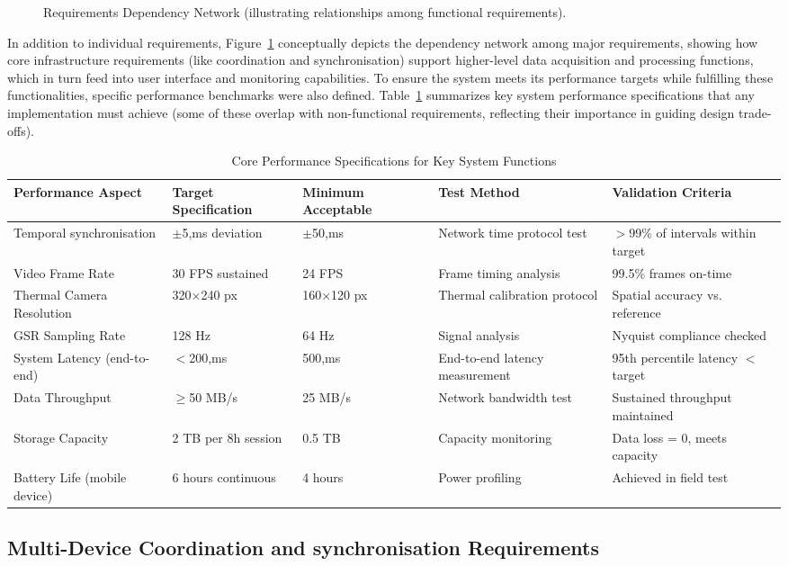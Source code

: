 \documentclass[11pt,a4paper]{report}
\begin{document}
\begin{figure}[h]
\centering
\fbox{\rule{0pt}{0.2\textheight}\rule{0.8\textwidth}{0pt}}
\caption{Requirements Dependency Network (illustrating relationships among functional requirements).}
\label{fig:fr_dependency}
\end{figure} In addition to individual requirements, Figure~\ref{fig:fr_dependency} conceptually depicts the dependency network among major requirements, showing how core infrastructure requirements (like coordination and synchronisation) support higher-level data acquisition and processing functions, which in turn feed into user interface and monitoring capabilities. To ensure the system meets its performance targets while fulfilling these functionalities, specific performance benchmarks were also defined. Table~\ref{tab:perf_matrix} summarizes key system performance specifications that any implementation must achieve (some of these overlap with non-functional requirements, reflecting their importance in guiding design trade-offs). \begin{table}[h]
\centering
\caption{Core Performance Specifications for Key System Functions}
\label{tab:perf_matrix}
\begin{tabular}{p{3.2cm} p{3.3cm} p{3.3cm} p{3.3cm} p{3.5cm}}
\toprule
\textbf{Performance Aspect} & \textbf{Target Specification} & \textbf{Minimum Acceptable} & \textbf{Test Method} & \textbf{Validation Criteria} \\
\midrule
Temporal synchronisation & $\pm$5,ms deviation & $\pm$50,ms & Network time protocol test & $>$99\% of intervals within target \\
Video Frame Rate & 30 FPS sustained & 24 FPS & Frame timing analysis & 99.5\% frames on-time \\
Thermal Camera Resolution & 320$\times$240 px & 160$\times$120 px & Thermal calibration protocol & Spatial accuracy vs. reference \\
GSR Sampling Rate & 128 Hz & 64 Hz & Signal analysis & Nyquist compliance checked \\
System Latency (end-to-end) & $<$200,ms & 500,ms & End-to-end latency measurement & 95th percentile latency $<$ target \\
Data Throughput & $\geq$50 MB/s & 25 MB/s & Network bandwidth test & Sustained throughput maintained \\
Storage Capacity & 2 TB per 8h session & 0.5 TB & Capacity monitoring & Data loss = 0, meets capacity \\
Battery Life (mobile device) & 6 hours continuous & 4 hours & Power profiling & Achieved in field test \\
\bottomrule
\end{tabular}
\end{table} \subsection{Multi-Device Coordination and synchronisation Requirements}
\end{document}
